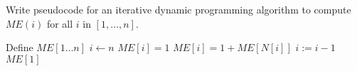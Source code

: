 \begin{questions}
\begin{soln}
	\end{soln}

	\question[4] Write pseudocode for an iterative dynamic programming algorithm to compute $ME(i)$ for all $i$ in $[1, \ldots, n]$.
	\ifsolutions\fi
	\begin{soln}
		\begin{algorithmic}[1]
			\State Define $ME[1 \dots n]$
			\State $i \gets n$
			\State $ME[i] = 1$
			\Else
			\State $ME[i] = 1 + ME[N[i]]$
			\EndIf
			\State $i := i - 1$
			\EndWhile
			\State \Return $ME[1]$
			\EndProcedure
		\end{algorithmic}
	\end{soln}


\end{questions}
